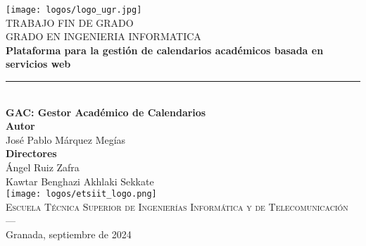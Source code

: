 \begin{titlepage}
\newlength{\centeroffset}
\setlength{\centeroffset}{-0.5\oddsidemargin}
\addtolength{\centeroffset}{0.5\evensidemargin}
\thispagestyle{empty}

\noindent\hspace*{\centeroffset}\begin{minipage}{\textwidth}

\centering
\texttt{[image: logos/logo\_ugr.jpg]}\\[1.4cm]

\textsc{ \Large TRABAJO FIN DE GRADO\\[0.2cm]}
\textsc{ GRADO EN INGENIERIA INFORMATICA}\\[1cm]

{\huge\bfseries Plataforma para la gestión de calendarios académicos basada en servicios web \\}
\noindent\rule[-1ex]{\textwidth}{3pt}\\[3.5ex]
{\large\bfseries GAC: Gestor Académico de Calendarios}\\
\vspace{1cm}
\textbf{Autor}\\ {José Pablo Márquez Megías}\\[2.5ex]
\textbf{Directores}\\ {Ángel Ruiz Zafra\\Kawtar Benghazi Akhlaki Sekkate}\\[2cm]
\texttt{[image: logos/etsiit\_logo.png]}\\[0.1cm]
\textsc{Escuela Técnica Superior de Ingenierías Informática y de Telecomunicación}\\
\textsc{---}\\
Granada, septiembre de 2024
\end{minipage}
\end{titlepage}

